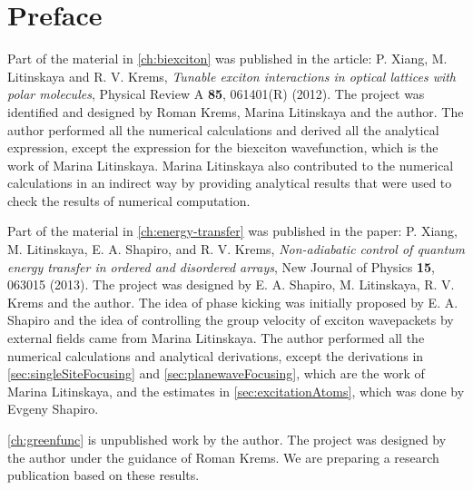 
\chapter{Preface}

Part of the material in \autoref{ch:biexciton} was published in the article: P. Xiang, M. Litinskaya and R. V. Krems, \textit{ Tunable exciton 
interactions in optical lattices with polar molecules}, Physical Review A {\bf 85}, 061401(R) (2012). The project was identified and 
designed by Roman Krems,  Marina Litinskaya and  the author. The author performed all the numerical calculations and
derived all the analytical expression, except the expression for the biexciton wavefunction, which is the work of Marina 
Litinskaya. Marina Litinskaya also contributed to the numerical calculations in an indirect way by providing analytical 
results that were used to check the results of numerical computation. 

Part of the material in \autoref{ch:energy-transfer} was published in the paper: P. Xiang, M. Litinskaya, E. A. Shapiro, and R. V. Krems, 
 \textit{ Non-adiabatic control of quantum energy transfer in ordered and disordered arrays}, 
 New Journal of Physics {\bf 15}, 063015 (2013).  
The project was designed by E. A. Shapiro, M. Litinskaya, R. V. Krems and the author. The idea of phase kicking was initially
proposed by E. A. Shapiro and the idea of controlling the group velocity of exciton wavepackets by external fields came 
from Marina Litinskaya. The author performed all the numerical calculations and analytical derivations, except the 
derivations in \autoref{sec:singleSiteFocusing} and \autoref{sec:planewaveFocusing}, which are the work of Marina Litinskaya, and the estimates in \autoref{sec:excitationAtoms}, which was done by  Evgeny Shapiro. 

\autoref{ch:greenfunc} is unpublished work by the author. The project was designed by the author under the guidance of
Roman Krems. We are preparing a research publication based on these results. 
